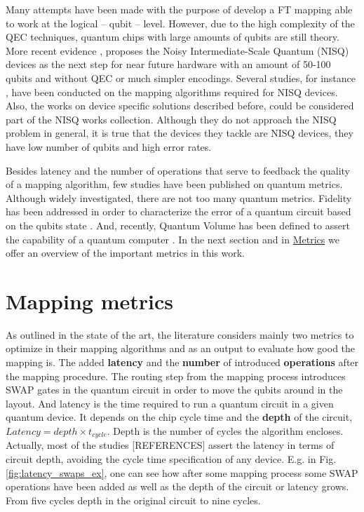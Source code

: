 Many attempts have been made \cite{Dousti_2014,Heckey_2015,hwang18:hierar_system_mappin_large_scale,murphy18:contr,Lao_2018} with the purpose of develop a FT mapping able to work at the logical -- qubit -- level.
However, due to the high complexity of the QEC techniques, quantum chips with large amounts of qubits are still theory.
More recent evidence \cite{Preskill_2018}, proposes the Noisy Intermediate-Scale Quantum (NISQ) devices as the next step for near future hardware with an amount of 50-100 qubits and without QEC or much simpler encodings.
Several studies, for instance \cite{tannu18:case_variab_aware_polic_nisq,paler18:nisq,paler18:influen_initial_qubit_placem_durin}, have been conducted on the mapping algorithms required for NISQ devices.
Also, the works on device specific solutions \cite{zulehner17:effic_method_mappin_quant_circuit,Siraichi_2018,mckay18:qiskit_backen_specif_openq_openp_exper,Dueck_2018,Venturelli_2018} described before, could be considered part of the NISQ works collection.
Although they do not approach the NISQ problem in general, it is true that the devices they tackle are NISQ devices, they have low number of qubits and high error rates.

Besides latency and the number of operations that serve to feedback the quality of a mapping algorithm, few studies have been published on quantum metrics.
Although widely investigated, there are not too many quantum metrics.
Fidelity has been addressed in order to characterize the error of a quantum circuit based on the qubits state \cite{Jozsa_1994,Nielsen_2009}.
And, recently, Quantum Volume has been defined to assert the capability of a quantum computer \cite{Moll_2018}.
In the next section and in \href{chapter-3.org}{Metrics} we offer an overview of the important metrics in this work.

\section*{Mapping metrics}
\label{sec:org2acd8fd}
As outlined in the state of the art, the literature considers mainly two metrics to optimize in their mapping algorithms and as an output to evaluate how good the mapping is.
The added \textbf{latency} and the \textbf{number} of introduced \textbf{operations} after the mapping procedure.
The routing step from the mapping process introduces SWAP gates in the quantum circuit in order to move the qubits around in the layout.
And latency is the time required to run a quantum circuit in a given quantum device.
It depends on the chip cycle time and the \textbf{depth} of the circuit, \(Latency = depth \times t_{cycle}\).
Depth is the number of cycles the algorithm encloses.
Actually, most of the studies [REFERENCES] assert the latency in terms of circuit depth, avoiding the cycle time specification of any device.
E.g. in Fig. \ref{fig:latency_swaps_ex}, one can see how after some mapping process some SWAP operations have been added as well as the depth of the circuit or latency grows.
From five cycles depth in the original circuit to nine cycles.


